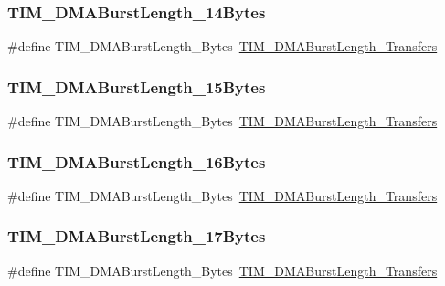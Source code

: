 \subsubsection{\texorpdfstring{TIM\_DMABurstLength\_14Bytes}{TIM\_DMABurstLength\_14Bytes}}
{\footnotesize\ttfamily \#define T\+I\+M\+\_\+\+D\+M\+A\+Burst\+Length\+\_\+Bytes~\mbox{\hyperlink{group___t_i_m___d_m_a___burst___length_gab1a097ca7404e518839df99795443fb0}{T\+I\+M\+\_\+\+D\+M\+A\+Burst\+Length\+\_\+Transfers}}}

\mbox{\label{group___t_i_m___legacy_ga3ca90d9fa3c80590175ba42baac57098}} 
\subsubsection{\texorpdfstring{TIM\_DMABurstLength\_15Bytes}{TIM\_DMABurstLength\_15Bytes}}
{\footnotesize\ttfamily \#define T\+I\+M\+\_\+\+D\+M\+A\+Burst\+Length\+\_\+Bytes~\mbox{\hyperlink{group___t_i_m___d_m_a___burst___length_gad13373f5fd246557a4fc487dc43c37ec}{T\+I\+M\+\_\+\+D\+M\+A\+Burst\+Length\+\_\+Transfers}}}

\mbox{\label{group___t_i_m___legacy_ga672117a7dafcd778fe8e86db423b07e9}} 
\subsubsection{\texorpdfstring{TIM\_DMABurstLength\_16Bytes}{TIM\_DMABurstLength\_16Bytes}}
{\footnotesize\ttfamily \#define T\+I\+M\+\_\+\+D\+M\+A\+Burst\+Length\+\_\+Bytes~\mbox{\hyperlink{group___t_i_m___d_m_a___burst___length_gafb644e6033f7b46c602b02754b69fde0}{T\+I\+M\+\_\+\+D\+M\+A\+Burst\+Length\+\_\+Transfers}}}

\mbox{\label{group___t_i_m___legacy_gacffd0dc1f04aa06624a4980dcae6eede}} 
\subsubsection{\texorpdfstring{TIM\_DMABurstLength\_17Bytes}{TIM\_DMABurstLength\_17Bytes}}
{\footnotesize\ttfamily \#define T\+I\+M\+\_\+\+D\+M\+A\+Burst\+Length\+\_\+Bytes~\mbox{\hyperlink{group___t_i_m___d_m_a___burst___length_ga5b2c97f650a3c1726965187d852b8cc5}{T\+I\+M\+\_\+\+D\+M\+A\+Burst\+Length\+\_\+Transfers}}}

